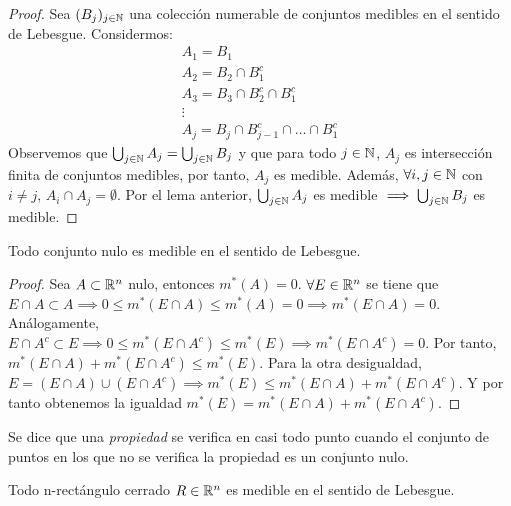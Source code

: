 \begin{proof}
    Sea $(B_j)_{j \in \mathbb{N}}$ una colección numerable de conjuntos medibles en el sentido de Lebesgue. Considermos:
    \[\begin{matrix}
            A_1 = B_1                       \\
            A_2 = B_2 \cap B_1^c            \\
            A_3 = B_3 \cap B_2^c \cap B_1^c \\
            \vdots                          \\
            A_j = B_j \cap B_{j-1}^c \cap \ldots \cap B_1^c
        \end{matrix}\]
    Observemos que $\bigcup_{j \in \mathbb{N}} A_j = \bigcup_{j \in \mathbb{N}} B_j$ y que para
    todo $j \in \mathbb{N}$, $A_j$ es intersección finita de conjuntos medibles, por tanto,
    $A_j$ es medible. Además, $\forall i,j \in \mathbb{N}$ con $i \neq j$, $A_i \cap A_j =
        \emptyset$. Por el lema anterior, $\bigcup_{j \in \mathbb{N}} A_j$ es medible $\implies
        \bigcup_{j \in \mathbb{N}} B_j$ es medible.
\end{proof}

\begin{proposición}
Todo conjunto nulo es medible en el sentido de Lebesgue.
\end{proposición}

\begin{proof}
    Sea $A \subset \mathbb{R}^n$ nulo, entonces $m^*(A) = 0$. $\forall E \in \mathbb{R}^n$ se tiene que $E \cap A \subset A \implies 0 \leq m^*(E \cap A) \leq m^*(A) = 0 \implies m^*(E \cap A) = 0$. Análogamente, $E \cap A^c \subset E \implies 0 \leq m^*(E \cap A^c) \leq m^*(E) \implies m^*(E \cap A^c) = 0$. Por tanto, $m^*(E \cap A) + m^*(E \cap A^c) \leq m^*(E)$. Para la otra desigualdad, $E = (E \cap A) \cup (E \cap A^c) \implies m^*(E) \leq m^*(E \cap A) + m^*(E \cap A^c)$. Y por tanto obtenemos la igualdad $m^*(E) = m^*(E \cap A) + m^*(E \cap A^c)$.
\end{proof}

\begin{definición}
Se dice que una \textit{propiedad} se verifica en casi todo punto cuando el conjunto de puntos en los que no se verifica la propiedad es un conjunto nulo.
\end{definición}

\begin{proposición}
Todo n-rectángulo cerrado $R \in \mathbb{R}^n$ es medible en el sentido de Lebesgue.
\end{proposición}

